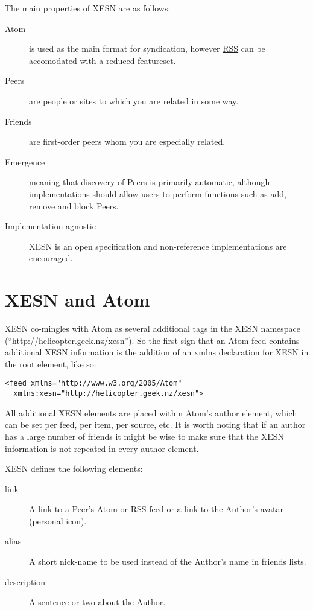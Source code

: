 \documentclass[titlepage,english,a4paper,twoside,dvips]{article}
\begin{document}
The main properties of XESN are as follows:

\begin{description}

\item[Atom] is used as the main format for syndication, however \href{http://blogs.law.harvard.edu/tech/rss}{RSS} can be accomodated with a reduced featureset.

\item[Peers] are people or sites to which you are related in some way.

\item[Friends] are first-order peers whom you are especially related.

\item[Emergence] meaning that discovery of Peers is primarily automatic, although implementations should allow users to perform functions such as add, remove and block Peers.

\item[Implementation agnostic] XESN is an open specification and non-reference implementations are encouraged.

\end{description}

\clearpage

\section{XESN and Atom}

XESN co-mingles with Atom as several additional tags in the XESN namespace (``http://helicopter.geek.nz/xesn'').  So the first sign that an Atom feed contains additional XESN information is the addition of an xmlns declaration for XESN in the root element, like so:

\begin{verbatim}
<feed xmlns="http://www.w3.org/2005/Atom" 
  xmlns:xesn="http://helicopter.geek.nz/xesn">
\end{verbatim}

All additional XESN elements are placed within Atom's author element, which can be set per feed, per item, per source, etc.  It is worth noting that if an author has a large number of friends it might be wise to make sure that the XESN information is not repeated in every author element.

XESN defines the following elements:

\begin{description}

\item[link] A link to a Peer's Atom or RSS feed or a link to the Author's avatar (personal icon).

\item[alias] A short nick-name to be used instead of the Author's name in friends lists.

\item[description] A sentence or two about the Author.

\end{description}
\end{document}
